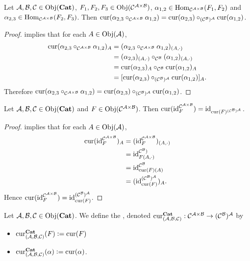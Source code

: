 \documentclass{book}
\begin{document}
	\begin{ex} 
		Let $\MA, \MB, \MC \in \Obj(\bCat)$, $F_1, F_2, F_3 \in \Obj(\MC^{\MA \times \MB})$, $\al_{1,2} \in \Hom_{\MC^{\MA \times \MB}}(F_1, F_2)$ and $\al_{2,3} \in \Hom_{\MC^{\MA \times \MB}}(F_2, F_3)$. Then $\cur(\al_{2,3} \circ_{\MC^{\MA \times \MB}} \al_{1,2}) = \cur(\al_{2,3}) \circ_{(\MC^{\MB})^{\MA}} \cur(\al_{1,2})$.
	\end{ex}
	
	\begin{proof}
		 implies that for each $A \in \Obj(\MA)$,
		\begin{align*}
			\cur(\al_{2,3} \circ_{\MC^{\MA \times \MB}} \al_{1,2})_A
			& = (\al_{2,3} \circ_{\MC^{\MA \times \MB}} \al_{1,2})_{(A, \cdot)} \\
			& = (\al_{2,3})_{(A, \cdot)} \circ_{\MC^{\MB}} (\al_{1,2})_{(A, \cdot)} \\
			& = \cur(\al_{2,3})_A \circ_{\MC^{\MB}} \cur(\al_{1,2})_A \\
			& = [\cur(\al_{2,3}) \circ_{(\MC^{\MB})^{\MA}} \cur(\al_{1,2})]_A.
		\end{align*}
		Therefore $\cur(\al_{2,3} \circ_{\MC^{\MA \times \MB}} \al_{1,2}) = \cur(\al_{2,3}) \circ_{(\MC^{\MB})^{\MA}} \cur(\al_{1,2})$.
	\end{proof}
	
	\begin{ex} 
		Let $\MA, \MB, \MC \in \Obj(\bCat)$ and $F \in \Obj(\MC^{\MA \times \MB})$. Then $\cur(\id_F^{\MC^{\MA \times \MB}}) = \id_{\cur(F)^{(\MC^{\MB})^{\MA}}}$. 
	\end{ex}
	
	\begin{proof}
		 implies that for each $A \in \Obj(\MA)$,
		\begin{align*}
			\cur(\id_F^{\MC^{\MA \times \MB}})_A
			& = (\id_F^{\MC^{\MA \times \MB}})_{(A, \cdot)} \\
			& = \id_{F(A, \cdot)}^{\MC^{\MB})} \\
			& = \id_{\cur(F)(A)}^{\MC^{\MB}} \\
			& = (\id_{\cur(F)}^{(\MC^{\MB})^{\MA}})_A.
		\end{align*}
		Hence $\cur(\id_F^{\MC^{\MA \times \MB}}) = \id_{\cur(F)}^{(\MC^{\MB})^{\MA}}$.
	\end{proof}
	
	\begin{defn} 
		Let $\MA, \MB, \MC \in \Obj(\bCat)$. We define the , denoted $\cur^{\bCat}_{(\MA, \MB, \MC)}: \MC^{\MA \times \MB} \rightarrow (\MC^{\MB})^{\MA}$ by 
		\begin{itemize}
			\item $\cur^{\bCat}_{(\MA, \MB, \MC)}(F) \defeq \cur(F)$
			\item $\cur^{\bCat}_{(\MA, \MB, \MC)}(\al) \defeq \cur(\al)$.
		\end{itemize}   
	\end{defn}
	
\end{document}

